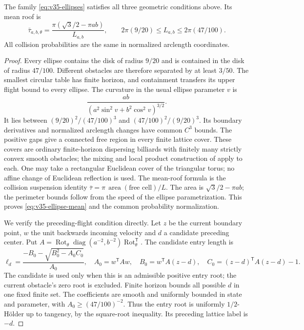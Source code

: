 \begin{lemma}
\label{lem:v35-ellipse-geometry}
The family \eqref{eq:v35-ellipses} satisfies all three geometric
conditions above. Its mean roof is
\begin{equation}\label{eq:v35-ellipse-mean}
 \bar\tau_{a,b,\theta}
       =\frac{\pi(\sqrt3/2-\pi ab)}{L_{a,b}},\qquad
 2\pi(9/20)\le L_{a,b}\le2\pi(47/100).
\end{equation}
All collision probabilities are the same in normalized arclength
coordinates.
\end{lemma}
\begin{proof}
Every ellipse contains the disk of radius $9/20$ and is contained in
the disk of radius $47/100$. Different obstacles are therefore
separated by at least $3/50$. The smallest circular table has finite
horizon, and containment transfers its upper flight bound to every
ellipse. The curvature in the usual ellipse parameter $v$ is
\[
 \frac{ab}{(a^2\sin^2v+b^2\cos^2v)^{3/2}}.
\]
It lies between $(9/20)^2/(47/100)^3$ and
$(47/100)^2/(9/20)^3$. Its boundary derivatives and normalized
arclength changes have common $C^3$ bounds. The positive gaps give a
connected free region in every finite lattice cover. These covers are
ordinary finite-horizon dispersing billiards with finitely many
strictly convex smooth obstacles; the mixing and local product
construction of \cite[Section 8, Theorem 6]{Young} apply to each.
One may take a rectangular Euclidean cover of the triangular torus;
no affine change of Euclidean reflection is used. The mean-roof
formula is the collision suspension identity
$\bar\tau=\pi\,\operatorname{area}(\text{free cell})/L$.
The area is $\sqrt3/2-\pi ab$; the perimeter bounds follow from the
speed of the ellipse parametrization. This proves
\eqref{eq:v35-ellipse-mean} and the common probability normalization.

We verify the preceding-flight condition directly. Let $z$ be the
current boundary point, $w$ the unit backwards incoming velocity and
$d$ a candidate preceding center. Put
$A=\operatorname{Rot}_\theta\operatorname{diag}(a^{-2},b^{-2})
\operatorname{Rot}_\theta^{\mathsf T}$. The candidate entry length is
\begin{equation}\label{eq:v35-ellipse-entry-root}
 \ell_d=\frac{-B_0-\sqrt{B_0^2-A_0C_0}}{A_0},\quad
 A_0=w^{\mathsf T}Aw,\quad B_0=w^{\mathsf T}A(z-d),\quad
 C_0=(z-d)^{\mathsf T}A(z-d)-1.
\end{equation}
The candidate is used only when this is an admissible positive entry
root; the current obstacle's zero root is excluded. Finite horizon
bounds all possible $d$ in one fixed finite set. The coefficients are
smooth and uniformly bounded in state and parameter, with
$A_0\ge(47/100)^{-2}$. Thus the entry root is uniformly $1/2$-H\"older
up to tangency, by the square-root inequality. Its preceding lattice
label is $-d$.


\end{proof}
